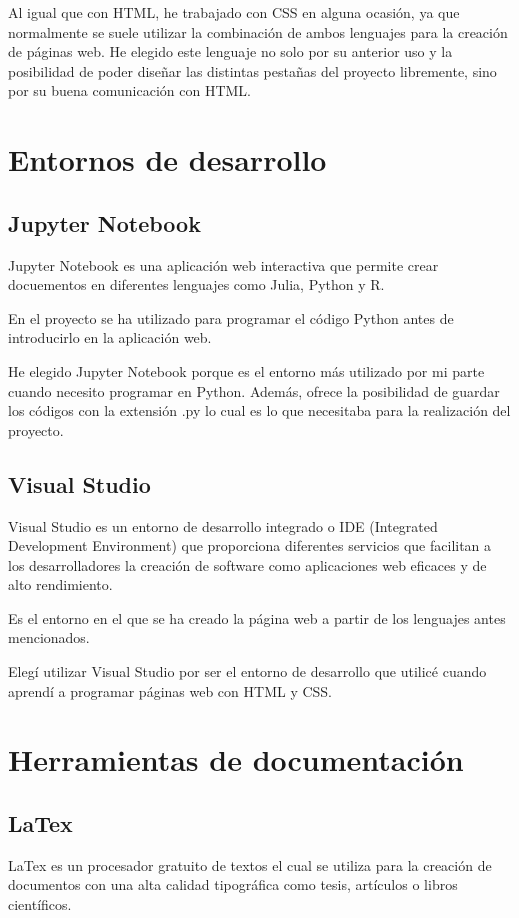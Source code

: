 Al igual que con HTML, he trabajado con CSS en alguna ocasión, ya que normalmente se suele utilizar la combinación de ambos lenguajes para la creación de páginas web. He elegido este lenguaje no solo por su anterior uso y la posibilidad de poder diseñar las distintas pestañas del proyecto libremente, sino por su buena comunicación con HTML.

\section{Entornos de desarrollo}
\subsection{Jupyter Notebook}
Jupyter Notebook \cite{wiki:jupyter} es una aplicación web interactiva que permite crear docuementos en diferentes lenguajes como Julia, Python y R.

En el proyecto se ha utilizado para programar el código Python antes de introducirlo en la aplicación web.

He elegido Jupyter Notebook porque es el entorno más utilizado por mi parte cuando necesito programar en Python. Además, ofrece la posibilidad de guardar los códigos con la extensión .py lo cual es lo que necesitaba para la realización del proyecto.

\subsection{Visual Studio}
Visual Studio \cite{wiki:visualStudio} es un entorno de desarrollo integrado o IDE (Integrated Development Environment) que proporciona diferentes servicios que facilitan a los desarrolladores la creación de software como aplicaciones web eficaces y de alto rendimiento.

Es el entorno en el que se ha creado la página web a partir de los lenguajes antes mencionados.

Elegí utilizar Visual Studio por ser el entorno de desarrollo que utilicé cuando aprendí a programar páginas web con HTML y CSS.

\section{Herramientas de documentación}
\subsection{LaTex}
LaTex \cite{wiki:latex} es un procesador gratuito de textos el cual se utiliza para la creación de documentos con una alta calidad tipográfica como tesis, artículos o libros científicos.

